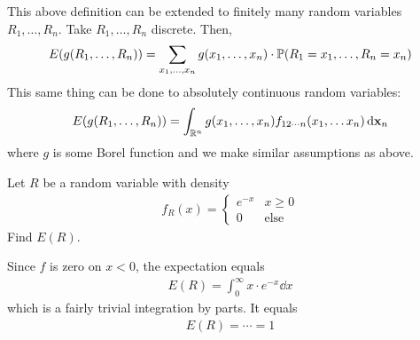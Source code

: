\begin{lemma}
    This above definition can be extended to finitely many random variables $R_1, \ldots, R_n$. Take $R_1, \ldots, R_n$ discrete. Then,
    \begin{align}
        E(g(R_1, \ldots, R_n)) = \sum_{x_1, \ldots, x_n} g(x_1, \ldots, x_n) \cdot \mathbb{P}(R_1 = x_1, \ldots, R_n = x_n)
    \end{align}
    This same thing can be done to absolutely continuous random variables:
    \begin{align}
        E(g(R_1, \ldots, R_n)) = \int_{\mathbb{R}^n} g(x_1, \ldots, x_n) f_{12\cdots n}(x_1, \ldots x_n) \dd{\vb{x}_n}
    \end{align}
    where $g$ is some Borel function and we make similar assumptions as above.
\end{lemma}

\begin{example}
    Let $R$ be a random variable with density
    \begin{align}
        f_R(x) = \begin{cases}
            e^{-x} & x \ge 0\\
            0 & \text{else}
        \end{cases}
    \end{align}
    Find $E(R)$.
\end{example}
\begin{solution}
    Since $f$ is zero on $x < 0$, the expectation equals
    \begin{align}
        E(R) = \int_0^\infty x \cdot e^{-x} \dd{x}
    \end{align}
    which is a fairly trivial integration by parts. It equals
    \begin{align}
        E(R) = \cdots = 1
    \end{align}
\end{solution}


